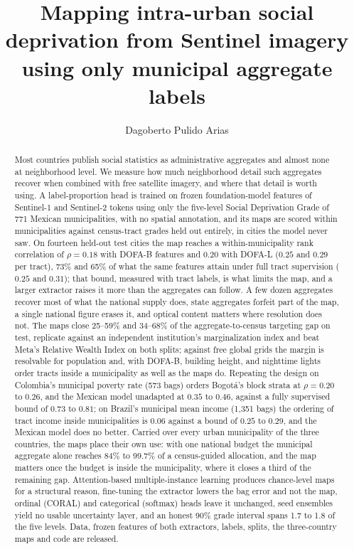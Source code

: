 \documentclass[11pt]{article}
\title{\textbf{Mapping intra-urban social deprivation from Sentinel imagery using
only municipal aggregate labels}}
\author[1]{Dagoberto Pulido Arias}
\affil[1]{Independent researcher, Mexico. Correspondence: dagopa.1010@gmail.com}
\date{}
\begin{document}
\maketitle

\begin{abstract}
\noindent Most countries publish social statistics as administrative aggregates and
almost none at neighborhood level. We measure how much neighborhood detail such
aggregates recover when combined with free satellite imagery, and where that detail is
worth using. A label-proportion head is trained on frozen foundation-model features of
Sentinel-1 and Sentinel-2 tokens using only the five-level Social Deprivation Grade of
771 Mexican municipalities, with no spatial annotation, and its maps are scored within
municipalities against census-tract grades held out entirely, in cities the model never
saw. On fourteen held-out test cities the map reaches a within-municipality rank
correlation of $\rho = 0.18$ with DOFA-B features and $0.20$ with DOFA-L ($0.25$ and
$0.29$ per tract), 73\% and 65\% of what the same features attain under full tract
supervision ($0.25$ and $0.31$); that bound, measured with tract labels, is what limits
the map, and a larger extractor raises it more than the aggregates can follow. A few
dozen aggregates recover most of what the national supply does, state aggregates
forfeit part of the map, a single national figure erases it, and optical content
matters where resolution does not. The maps close 25--59\% and 34--68\% of the
aggregate-to-census targeting gap on test, replicate against an independent
institution's marginalization index and beat Meta's Relative Wealth Index on both
splits; against free global grids the margin is resolvable for population and, with
DOFA-B, building height, and nighttime lights order tracts inside a municipality as
well as the maps do. Repeating the design on Colombia's municipal poverty rate (573
bags) orders Bogot\'a's block strata at $\rho = 0.20$ to $0.26$, and the Mexican model
unadapted at $0.35$ to $0.46$, against a fully supervised bound of $0.73$ to $0.81$; on
Brazil's municipal mean income (1{,}351 bags) the ordering of tract income inside
municipalities is $0.06$ against a bound of $0.25$ to $0.29$, and the Mexican model
does no better. Carried over every urban municipality of the three countries, the maps
place their own use: with one national budget the municipal aggregate alone reaches
84\% to 99.7\% of a census-guided allocation, and the map matters once the budget is
inside the municipality, where it closes a third of the remaining gap. Attention-based
multiple-instance learning produces chance-level maps for a structural reason,
fine-tuning the extractor lowers the bag error and not the map, ordinal (CORAL) and
categorical (softmax) heads leave it unchanged, seed ensembles yield no usable
uncertainty layer, and an honest 90\% grade interval spans 1.7 to 1.8 of the five
levels. Data, frozen features of both extractors, labels, splits, the three-country
maps and code are released.
\end{abstract}
\end{document}

